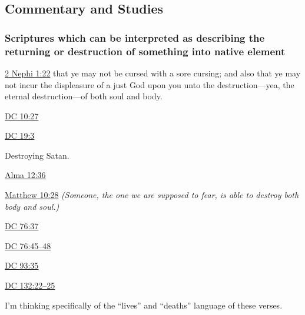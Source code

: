 \subsection{Commentary and Studies} %
	\label{NATIVEELEMENT-COMMENTARY}

	
		
	\subsubsection{Scriptures which can be interpreted as describing the returning or destruction of something into native element}
		\label{NATIVEELEMENT-study}
		
		\begin{compactdesc}
			\item[{\hyperref[2NEPHI-1-22]{2 Nephi 1:22}}] that ye may not be cursed with a sore cursing; and also that ye may not incur the displeasure of a just God upon you unto the destruction---yea, the eternal destruction---of both soul and body.
			\item[{\hyperref[DC10-27]{DC 10:27}}]
			\item[{\hyperref[DC19-3]{DC 19:3}}] \phantom{.}
				\begin{compactitem}
					\item Destroying Satan.
				\end{compactitem}
			\item[{\hyperref[ALMA-12-36]{Alma 12:36}}] 
			\item[{\hyperref[MATTHEW-10-28]{Matthew 10:28}}]  \textit{(Someone, the one we are supposed to fear, is able to destroy both body and soul.)}
			\item[{\hyperref[DC76-73]{DC 76:37}}] 
			\item[{\hyperref[DC76-45]{DC 76:45--48}}]
			\item[{\hyperref[DC93-35]{DC 93:35}}]
			\item[{\hyperref[DC132-22]{DC 132:22--25}}] \phantom{.}
				\begin{compactitem}
					\item I'm thinking specifically of the ``lives'' and ``deaths'' language of these verses.
				\end{compactitem}
		\end{compactdesc}